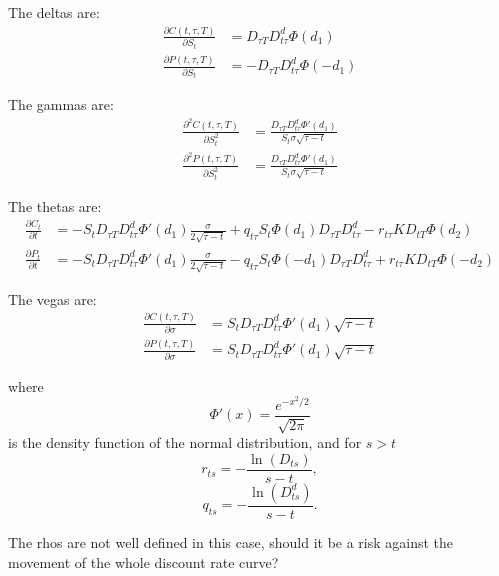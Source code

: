 The deltas are: 
\begin{align}
	\frac{\partial C(t,\tau,T)}{\partial S_t} &=   D_{\tau T} D_{t\tau}^d \Phi(d_1)   \\
	\frac{\partial P(t,\tau,T)}{\partial S_t} &= - D_{\tau T} D_{t\tau}^d \Phi(-d_1)
\end{align}

The gammas are:
\begin{align}
	\frac{\partial^2 C(t,\tau,T)}{\partial S_t^2} 
  	&= \frac{D_{\tau T} D_{t\tau}^d \Phi'(d_1)}{S_t \sigma \sqrt{\tau-t}}  \\
	\frac{\partial^2 P(t,\tau,T)}{\partial S_t^2} 
  	&= \frac{D_{\tau T} D_{t\tau}^d \Phi'(d_1)}{S_t \sigma \sqrt{\tau-t}}
\end{align}

The thetas are:
\begin{align}
	\frac{\partial C_t}{\partial t} 
	  &= - S_t  D_{\tau T} D_{t\tau}^d \Phi'(d_1) \frac{\sigma}{2\sqrt{\tau-t}} 
     	 + q_{t\tau} S_t \Phi(d_1) D_{\tau T} D_{t\tau}^d  
			 - r_{t\tau} K D_{tT} \Phi(d_2)    \\
	\frac{\partial P_t}{\partial t} 
	&= - S_t D_{\tau T} D_{t\tau}^d \Phi'(d_1) \frac{\sigma}{2\sqrt{\tau-t}} 
	   - q_{t\tau} S_t \Phi(-d_1) D_{\tau T} D_{t\tau}^d 
	   + r_{t\tau} K D_{tT} \Phi(-d_2)  
\end{align}

The vegas are:
\begin{align}
	\frac{\partial C(t,\tau,T)}{\partial \sigma} &= S_t D_{\tau T} D_{t\tau}^d
  	\Phi'(d_1) \sqrt{\tau-t}   \\
	\frac{\partial P(t,\tau,T)}{\partial \sigma} &= S_t D_{\tau T} D_{t\tau}^d
		\Phi'(d_1) \sqrt{\tau-t}
\end{align}

where
\[
	\Phi'(x)=\frac{e^{-x^2/2}}{\sqrt{2\pi}}
\]
is the density function of the normal distribution,
and for $s>t$
\[
	r_{ts} = -\frac{\ln(D_{ts})}{s-t},
\]
\[
	q_{ts} = -\frac{\ln(D_{ts}^d)}{s-t}.
\]

The rhos are not well defined in this case, should it be a risk against the
movement of the whole discount rate curve?


